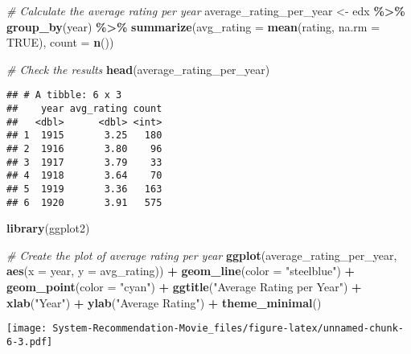 \documentclass[
]{article}
\newenvironment{Shaded}{\begin{snugshade}}{\end{snugshade}}
\newcommand{\AttributeTok}[1]{\textcolor[rgb]{0.13,0.29,0.53}{#1}}
\newcommand{\CommentTok}[1]{\textcolor[rgb]{0.56,0.35,0.01}{\textit{#1}}}
\newcommand{\ConstantTok}[1]{\textcolor[rgb]{0.56,0.35,0.01}{#1}}
\newcommand{\FunctionTok}[1]{\textcolor[rgb]{0.13,0.29,0.53}{\textbf{#1}}}
\newcommand{\NormalTok}[1]{#1}
\newcommand{\OtherTok}[1]{\textcolor[rgb]{0.56,0.35,0.01}{#1}}
\newcommand{\SpecialCharTok}[1]{\textcolor[rgb]{0.81,0.36,0.00}{\textbf{#1}}}
\newcommand{\StringTok}[1]{\textcolor[rgb]{0.31,0.60,0.02}{#1}}
\begin{document}
\begin{Shaded}
\begin{Highlighting}[]
\CommentTok{\# Calculate the average rating per year}
\NormalTok{average\_rating\_per\_year }\OtherTok{\textless{}{-}}\NormalTok{ edx }\SpecialCharTok{\%\textgreater{}\%}
  \FunctionTok{group\_by}\NormalTok{(year) }\SpecialCharTok{\%\textgreater{}\%}
  \FunctionTok{summarize}\NormalTok{(}\AttributeTok{avg\_rating =} \FunctionTok{mean}\NormalTok{(rating, }\AttributeTok{na.rm =} \ConstantTok{TRUE}\NormalTok{), }\AttributeTok{count =} \FunctionTok{n}\NormalTok{())}

\CommentTok{\# Check the results}
\FunctionTok{head}\NormalTok{(average\_rating\_per\_year)}
\end{Highlighting}
\end{Shaded}

\begin{verbatim}
## # A tibble: 6 x 3
##    year avg_rating count
##   <dbl>      <dbl> <int>
## 1  1915       3.25   180
## 2  1916       3.80    96
## 3  1917       3.79    33
## 4  1918       3.64    70
## 5  1919       3.36   163
## 6  1920       3.91   575
\end{verbatim}

\begin{Shaded}
\begin{Highlighting}[]
\FunctionTok{library}\NormalTok{(ggplot2)}

\CommentTok{\# Create the plot of average rating per year}
\FunctionTok{ggplot}\NormalTok{(average\_rating\_per\_year, }\FunctionTok{aes}\NormalTok{(}\AttributeTok{x =}\NormalTok{ year, }\AttributeTok{y =}\NormalTok{ avg\_rating)) }\SpecialCharTok{+}
  \FunctionTok{geom\_line}\NormalTok{(}\AttributeTok{color =} \StringTok{"steelblue"}\NormalTok{) }\SpecialCharTok{+}
  \FunctionTok{geom\_point}\NormalTok{(}\AttributeTok{color =} \StringTok{"cyan"}\NormalTok{) }\SpecialCharTok{+}
  \FunctionTok{ggtitle}\NormalTok{(}\StringTok{"Average Rating per Year"}\NormalTok{) }\SpecialCharTok{+}
  \FunctionTok{xlab}\NormalTok{(}\StringTok{"Year"}\NormalTok{) }\SpecialCharTok{+}
  \FunctionTok{ylab}\NormalTok{(}\StringTok{"Average Rating"}\NormalTok{) }\SpecialCharTok{+}
  \FunctionTok{theme\_minimal}\NormalTok{()}
\end{Highlighting}
\end{Shaded}

\texttt{[image: System-Recommendation-Movie\_files/figure-latex/unnamed-chunk-6-3.pdf]}
\end{document}
